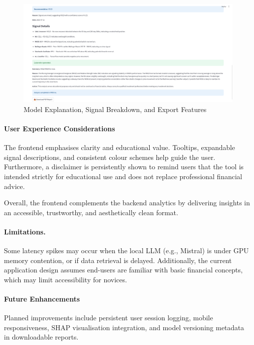 \begin{figure}[h]
\centering
\includegraphics[width=0.9\linewidth]{assets/ui3-explanation.png}
\caption{Model Explanation, Signal Breakdown, and Export Features}
\label{fig:ui_explanation}
\end{figure}

\FloatBarrier

\paragraph{User Experience Considerations}
The frontend emphasises clarity and educational value. Tooltips, expandable signal descriptions, and consistent colour schemes help guide the user. Furthermore, a disclaimer is persistently shown to remind users that the tool is intended strictly for educational use and does not replace professional financial advice.

Overall, the frontend complements the backend analytics by delivering insights in an accessible, trustworthy, and aesthetically clean format.

\paragraph{Limitations.}  
Some latency spikes may occur when the local LLM (e.g., Mistral) is under GPU memory contention, or if data retrieval is delayed. Additionally, the current application design assumes end-users are familiar with basic financial concepts, which may limit accessibility for novices.

\paragraph{Future Enhancements}  
Planned improvements include persistent user session logging, mobile responsiveness, SHAP visualisation integration, and model versioning metadata in downloadable reports.

